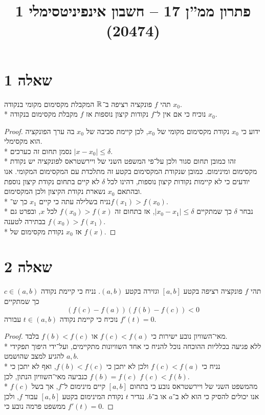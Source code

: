 
\title{פתרון ממ''ן 17 – חשבון אינפיניטסימלי 1 (20474)}


\maketitle
\section{שאלה 1}
תהי $f$ פונקציה רציפה ב־$\mathbb{R}$ המקבלת מקסימום מקומי בנקודה $x_0$. \\*
נוכיח כי אם אין ל־$f$ נקודות קיצון נוספות אז $f$ מקבלת מקסימום בנקודה $x_0$.
\begin{proof}
	ידוע כי $x_0$ נקודת מקסימום מקומי של $x_0$, לכן קיימת סביבה של $x_0$ בה ערך הפונקציה הוא מקסימלי. \\*
	נסמן תחום זה כערכים $|x - x_0| \le \delta$. \\*
	זהו כמובן תחום סגור ולכן על־פי המשפט השני של ויירשטראס לפונקציה יש נקודת מקסימום ומינימום.
	כמובן שנקודת המקסימום בקטע זה מתלכדת עם המקסימום המקומי.
	אנו יודעים כי לא קיימות נקודות קיצון נוספות, דהינו לכל $\delta$ לא קיים בתחום נקודת קיצון נוספת ובהתאם $x_0$ נשארת נקודת הקיצון ולכן המקסימום. \\*
	נניח בשלילה עתה כי קיים $x_1$ כך ש־$f(x_1) > f(x_0)$. \\*
	נבחר $\delta$ כך שמתקיים $|x_0 - x_1| \le \delta$, אז בתחום זה $f(x_0) > f(x)$ לכל $x$, ובפרט גם $f(x_0) > f(x_1)$ בבתירה לטענה. \\*
	אז $x_0$ נקודת מקסימום של $f(x)$.
\end{proof}

\section{שאלה 2}
תהי $f$ פונקציה רציפה בקטע $[a, b]$ וגזירה בקטע $(a, b)$. נניח כי קיימת נקודה $c \in (a, b)$ כך שמתקיים
\[
	(f(c) - f(a))(f(b) - f(c)) < 0
\]
נוכיח כי קיימת נקודה $t \in (a, b)$ עבורה $f'(t) = 0$.
\begin{proof}
	מאי־השוויון נובע ישירות כי $f(c) < f(a)$ או $f(b) < f(c)$ בלבד. \\*
	ללא פגיעה בכלליות ההוכחה נוכל להניח כי אחד השוויונות מתקיימים, ועל־ידי היפוך תפקידי $a, b$ להגיע למצב שהושמט. \\*
	נניח כי $f(c) < f(a)$ ולכן לא יתכן כי $f(b) < f(c)$, ואף לא יתכן כי $f(b) = f(c)$ כנביעה מאי־השוויון הנתון, לכן $f(c) < f(b)$. \\*
	מהמשפט השני של ויירשטראס נובע כי בתחום $[a, b]$ קיים מינימום ל־$f$, אך בשל $f(c)$ אנו יכולים להסיק כי הוא לא ב־$a$ או ב־$b$.
	נגדיר $t$ נקודת המינימום בקטע $[a, b]$ עבור $f$, ולכן ממשפט פרמה נובע כי $f'(t) = 0$.
\end{proof}


